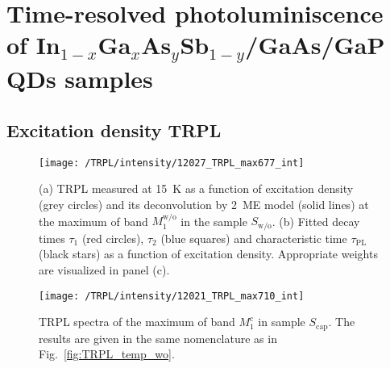 \chapter{Time-resolved photoluminiscence of In$_{1-x}$Ga$_{x}$As$_y$Sb$_{1-y}$/GaAs/GaP QDs samples}

\section{Excitation density TRPL}
\label{chapter:appendix_TRPL_int}
\begin{figure}
	\centering
	\texttt{[image: /TRPL/intensity/12027\_TRPL\_max677\_int]}
	\caption{(a) TRPL measured at 15~K as a function of excitation density (grey circles) and its deconvolution by 2~ME model (solid lines) at the maximum of band $M_1^\mathrm{w/o}$ in the sample $S_\mathrm{w/o}$. (b) Fitted decay times $\tau_1$ (red circles), $\tau_2$ (blue squares) and characteristic time $\tau_\mathrm{PL}$ (black stars) as a function of excitation density. Appropriate weights are visualized in panel (c).}
	\label{fig:TRPL_int_wo}
\end{figure}


\begin{figure}
	\centering
	\texttt{[image: /TRPL/intensity/12021\_TRPL\_max710\_int]}
	\caption{TRPL spectra of the maximum of band $M_1^\mathrm{c}$ in sample $S_\mathrm{cap}$. The results are given in the same nomenclature as in Fig.~\ref{fig:TRPL_temp_wo}.}
	\label{fig:TRPL_int_c}
\end{figure}
\newpage 
